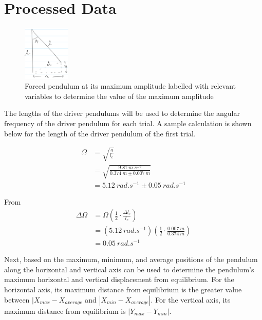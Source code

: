 \documentclass[letterpaper, 12pt]{article}
\begin{document}
\section{Processed Data}

\begin{figure}
    \centering
    \includegraphics[width=0.2\textwidth]{determineAmplitude.png}
    \caption{Forced pendulum at its maximum amplitude labelled with relevant variables to determine the value of the maximum amplitude}
    \label{fig:determineAmplitude}
\end{figure}

The lengths of the driver pendulums will be used to determine
the angular frequency of the driver pendulum for each trial.
A sample calculation is shown below for the length of the
driver pendulum of the first trial.

\begin{paracol}{2}
    \begin{align*}
        \Omega & = \sqrt{\frac{g}{l_e}}
        \\
               & = \sqrt{\frac{\SI{9.81}{m.s^{-2}}}{\SI{0.374}{m} \pm \SI{0.007}{m}}}
        \\
               & = \SI{5.12}{rad.s^{-1}} \pm \SI{0.05}{rad.s^{-1}}
    \end{align*}
    \switchcolumn
    \begin{adjustwidth}{-1.5cm}{0cm}
        From \cite{gonzalesMeasurementUncertaintySquares2022}
        \begin{align*}
            \Delta \Omega & = \Omega \left( \frac{1}{2} \cdot \frac{\Delta l_e}{l_e} \right)
            \\
                          & = (\SI{5.12}{rad.s^{-1}})\left( \frac{1}{2} \cdot \frac{\SI{0.007}{m}}{\SI{0.374}{m}} \right)
            \\
                          & = \SI{0.05}{rad.s^{-1}}
        \end{align*}
    \end{adjustwidth}
\end{paracol}

Next, based on the maximum, minimum, and average
positions of the pendulum along the horizontal and
vertical axis can be used to determine
the pendulum's maximum horizontal and vertical
displacement from equilibrium.
For the horizontal axis, its maximum
distance from equilibrium is the greater
value between \(|X_{max} - X_{average}\)
and \(|X_{min} - X_{average}|\).
For the vertical axis, its
maximum distance from equilibrium is
\(|Y_{max} - Y_{min}|\).
\end{document}

